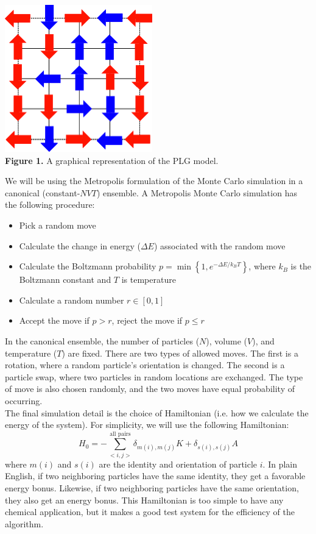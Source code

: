 \documentclass{article}
\begin{document}
\begin{center}
\includegraphics[scale=0.6]{PLG.png}\\
\textbf{Figure 1.} A graphical representation of the PLG model.
\end{center}

\newpage

We will be using the Metropolis formulation of the Monte Carlo simulation in a canonical (constant-$NVT$) ensemble. A Metropolis Monte Carlo simulation has the following procedure:
\begin{itemize}
\item Pick a random move
\item Calculate the change in energy ($\Delta E$) associated with the random move
\item Calculate the Boltzmann probability $p = \min\left\{1, e^{-\Delta E/k_B T}\right\}$, where $k_B$ is the Boltzmann constant and $T$ is temperature
\item Calculate a random number $r \in [0,1]$
\item Accept the move if $p > r$, reject the move if $p \leq r$
\end{itemize}
In the canonical ensemble, the number of particles ($N$), volume ($V$), and temperature ($T$) are fixed. There are two types of allowed moves. The first is a rotation, where a random particle's orientation is changed. The second is a particle swap, where two particles in random locations are exchanged. The type of move is also chosen randomly, and the two moves have equal probability of occurring.\\
The final simulation detail is the choice of Hamiltonian (i.e. how we calculate the energy of the system). For simplicity, we will use the following Hamiltonian:
$$H_0 = - \sum_{<i,j>}^{\textrm{all pairs}} \delta_{m(i),m(j)} K + \delta_{s(i),s(j)} A$$
where $m(i)$ and $s(i)$ are the identity and orientation of particle $i$. In plain English, if two neighboring particles have the same identity, they get a favorable energy bonus. Likewise, if two neighboring particles have the same orientation, they also get an energy bonus. This Hamiltonian is too simple to have any chemical application, but it makes a good test system for the efficiency of the algorithm.
\end{document}
